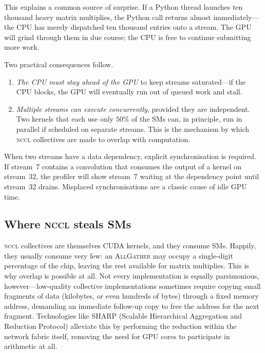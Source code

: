 \documentclass[11pt,a4paper]{article}
\theoremstyle{definition}
\theoremstyle{remark}
\newcommand{\NCCL}{\textsc{nccl}}
\newcommand{\AllGather}{\textsc{AllGather}}
\begin{document}
This explains a common source of surprise. If a Python thread launches ten thousand heavy matrix multiplies, the Python call returns almost immediately---the CPU has merely dispatched ten thousand entries onto a stream. The GPU will grind through them in due course; the CPU is free to continue submitting more work.

Two practical consequences follow.

\begin{enumerate}[leftmargin=2em, itemsep=0.15em]
    \item \emph{The CPU must stay ahead of the GPU} to keep streams saturated---if the CPU blocks, the GPU will eventually run out of queued work and stall.
    \item \emph{Multiple streams can execute concurrently}, provided they are independent. Two kernels that each use only $50\%$ of the SMs can, in principle, run in parallel if scheduled on separate streams. This is the mechanism by which \NCCL{} collectives are made to overlap with computation.
\end{enumerate}


When two streams have a data dependency, explicit synchronisation is required. If stream~7 contains a convolution that consumes the output of a kernel on stream~32, the profiler will show stream~7 waiting at the dependency point until stream~32 drains. Misplaced synchronisations are a classic cause of idle GPU time.

\subsection{Where \NCCL{} steals SMs}

\NCCL{} collectives are themselves CUDA kernels, and they consume SMs. Happily, they usually consume very few: an \AllGather{} may occupy a single-digit percentage of the chip, leaving the rest available for matrix multiplies. This is why overlap is possible at all. Not every implementation is equally parsimonious, however---low-quality collective implementations sometimes require copying small fragments of data (kilobytes, or even hundreds of bytes) through a fixed memory address, demanding an immediate follow-up copy to free the address for the next fragment. Technologies like \textsc{SHARP} (Scalable Hierarchical Aggregation and Reduction Protocol) alleviate this by performing the reduction within the network fabric itself, removing the need for GPU cores to participate in arithmetic at all.
\end{document}
